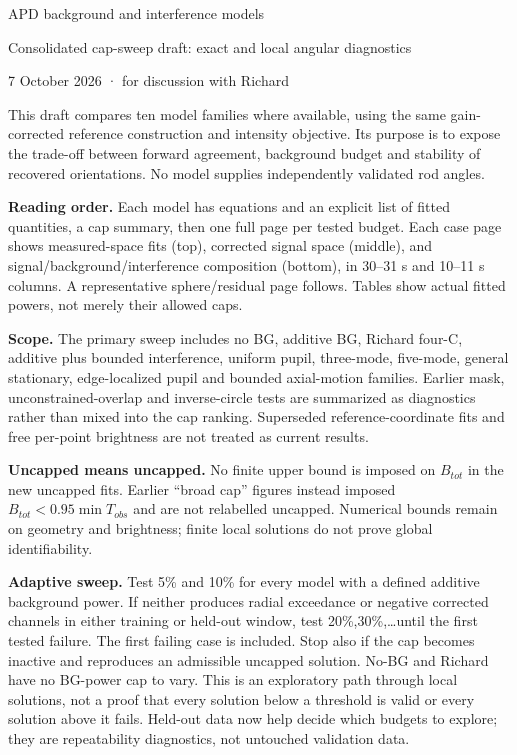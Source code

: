 \documentclass[10pt,a4paper]{article}
\begin{document}
{\LARGE APD background and interference models}\par
{\large Consolidated cap-sweep draft: exact and local angular diagnostics}\par 7 October 2026 · for discussion with Richard

This draft compares ten model families where available, using the same gain-corrected reference construction and intensity objective. Its purpose is to expose the trade-off between forward agreement, background budget and stability of recovered orientations. No model supplies independently validated rod angles.

\textbf{Reading order.} Each model has equations and an explicit list of fitted quantities, a cap summary, then one full page per tested budget. Each case page shows measured-space fits (top), corrected signal space (middle), and signal/background/interference composition (bottom), in 30--31 s and 10--11 s columns. A representative sphere/residual page follows. Tables show actual fitted powers, not merely their allowed caps.

\textbf{Scope.} The primary sweep includes no BG, additive BG, Richard four-C, additive plus bounded interference, uniform pupil, three-mode, five-mode, general stationary, edge-localized pupil and bounded axial-motion families. Earlier mask, unconstrained-overlap and inverse-circle tests are summarized as diagnostics rather than mixed into the cap ranking. Superseded reference-coordinate fits and free per-point brightness are not treated as current results.

\textbf{Uncapped means uncapped.} No finite upper bound is imposed on $B_{tot}$ in the new uncapped fits. Earlier ``broad cap'' figures instead imposed $B_{tot}<0.95\min T_{obs}$ and are not relabelled uncapped. Numerical bounds remain on geometry and brightness; finite local solutions do not prove global identifiability.

\textbf{Adaptive sweep.} Test 5\% and 10\% for every model with a defined additive background power. If neither produces radial exceedance or negative corrected channels in either training or held-out window, test 20\%,30\%,\ldots until the first tested failure. The first failing case is included. Stop also if the cap becomes inactive and reproduces an admissible uncapped solution. No-BG and Richard have no BG-power cap to vary. This is an exploratory path through local solutions, not a proof that every solution below a threshold is valid or every solution above it fails. Held-out data now help decide which budgets to explore; they are repeatability diagnostics, not untouched validation data.
\end{document}
